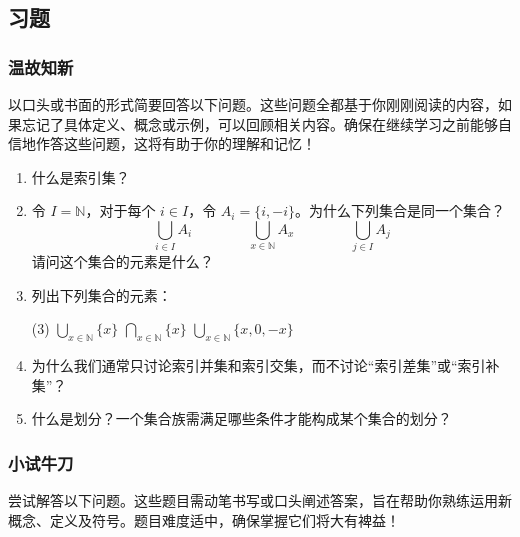 \subsection{习题}

\subsubsection*{温故知新}

以口头或书面的形式简要回答以下问题。这些问题全都基于你刚刚阅读的内容，如果忘记了具体定义、概念或示例，可以回顾相关内容。确保在继续学习之前能够自信地作答这些问题，这将有助于你的理解和记忆！

\begin{enumerate}[label=(\arabic*)]
    \item 什么是索引集？
    \item 令 $I = \mathbb{N}$，对于每个 $i \in I$，令 $A_i = \{i, -i\}$。为什么下列集合是同一个集合？
    \[\bigcup_{i \in I} A_i \qquad\qquad \bigcup_{x \in \mathbb{N}} A_x \qquad\qquad \bigcup_{j \in I} A_j\]
    请问这个集合的元素是什么？
    \item 列出下列集合的元素：
    \begin{tasks}(3)
        \task $\displaystyle{\bigcup_{x \in \mathbb{N}}\{x\}}$
        \task $\displaystyle{\bigcap_{x \in \mathbb{N}}\{x\}}$
        \task $\displaystyle{\bigcup_{x \in \mathbb{N}}\{x,0,-x\}}$
    \end{tasks}
    \item 为什么我们通常只讨论索引并集和索引交集，而不讨论``索引差集''或``索引补集''？
    \item 什么是划分？一个集合族需满足哪些条件才能构成某个集合的划分？
\end{enumerate}

\subsubsection*{小试牛刀}

尝试解答以下问题。这些题目需动笔书写或口头阐述答案，旨在帮助你熟练运用新概念、定义及符号。题目难度适中，确保掌握它们将大有裨益！


